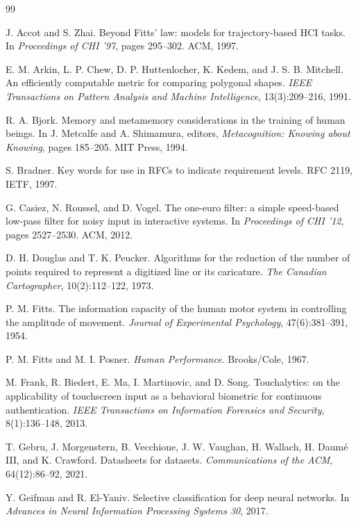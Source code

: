 \begin{thebibliography}{99}

 J. Accot and S. Zhai. Beyond Fitts' law: models for trajectory-based HCI tasks. In \emph{Proceedings of CHI '97}, pages 295--302. ACM, 1997.

 E. M. Arkin, L. P. Chew, D. P. Huttenlocher, K. Kedem, and J. S. B. Mitchell. An efficiently computable metric for comparing polygonal shapes. \emph{IEEE Transactions on Pattern Analysis and Machine Intelligence}, 13(3):209--216, 1991.

 R. A. Bjork. Memory and metamemory considerations in the training of human beings. In J. Metcalfe and A. Shimamura, editors, \emph{Metacognition: Knowing about Knowing}, pages 185--205. MIT Press, 1994.

 S. Bradner. Key words for use in RFCs to indicate requirement levels. RFC 2119, IETF, 1997.

 G. Casiez, N. Roussel, and D. Vogel. The one-euro filter: a simple speed-based low-pass filter for noisy input in interactive systems. In \emph{Proceedings of CHI '12}, pages 2527--2530. ACM, 2012.

 D. H. Douglas and T. K. Peucker. Algorithms for the reduction of the number of points required to represent a digitized line or its caricature. \emph{The Canadian Cartographer}, 10(2):112--122, 1973.

 P. M. Fitts. The information capacity of the human motor system in controlling the amplitude of movement. \emph{Journal of Experimental Psychology}, 47(6):381--391, 1954.

 P. M. Fitts and M. I. Posner. \emph{Human Performance}. Brooks/Cole, 1967.

 M. Frank, R. Biedert, E. Ma, I. Martinovic, and D. Song. Touchalytics: on the applicability of touchscreen input as a behavioral biometric for continuous authentication. \emph{IEEE Transactions on Information Forensics and Security}, 8(1):136--148, 2013.

 T. Gebru, J. Morgenstern, B. Vecchione, J. W. Vaughan, H. Wallach, H. Daum\'e III, and K. Crawford. Datasheets for datasets. \emph{Communications of the ACM}, 64(12):86--92, 2021.

 Y. Geifman and R. El-Yaniv. Selective classification for deep neural networks. In \emph{Advances in Neural Information Processing Systems 30}, 2017.


\end{thebibliography}

